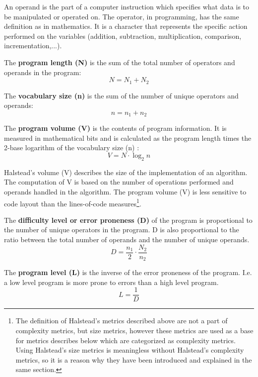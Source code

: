 An operand is the part of a computer instruction which specifies what data is to be manipulated or operated on. The operator, in programming, has the same definition as in mathematics. It is a character that represents the specific action performed on the variables (addition, subtraction, multiplication, comparison, incrementation,...). 

The \textbf{program length (N)} is the sum of the total number of operators and operands in the program:
\begin{equation}
N={ N }_{ 1 }+{ N }_{ 2 }
\end{equation}

The \textbf{vocabulary size (n)} is the sum of the number of unique operators and operands:
\begin{equation}
n={ n }_{ 1 }+{ n }_{ 2 }
\end{equation}

The \textbf{program volume (V)} is the contents of program information. It is measured in mathematical bits and is calculated as the program length times the 2-base logarithm of the vocabulary size (n) :
\begin{equation}
V=N\cdot \log _{ 2 }{ n } 
\end{equation}

Halstead's volume (V) describes the size of the implementation of an algorithm. The computation of V is based on the number of operations performed and operands handled in the algorithm. The program volume (V) is less sensitive to code layout than the lines-of-code measures\footnote{The definition of Halstead's metrics described above are not a part of complexity metrics, but size metrics, however these metrics are used as a base for metrics describes below which are categorized as complexity metrics. Using Halstead's size metrics is meaningless without Halstead's complexity metrics, so it is a reason why they have been introduced and explained in the same section.}. 

The \textbf{difficulty level or error proneness (D)} of the program is proportional to the number of unique operators in the program. D is also proportional to the ratio between the total number of operands and the number of unique operands. 
\begin{equation}
D=\frac { { n }_{ 1 } }{ 2 } \cdot \frac { { N }_{ 2 } }{ { n }_{ 2 } } 
\end{equation}
        
The \textbf{program level (L)} is the inverse of the error proneness of the program. I.e. a low level program is more prone to errors than a high level program.
\begin{equation}
L=\frac { 1 }{ D } 
\end{equation}
        

